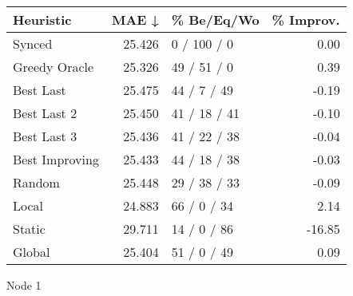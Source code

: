 \begin{tabular}{lrlr}
\toprule
\textbf{Heuristic} & \textbf{MAE ↓} & \textbf{\% Be/Eq/Wo} & \textbf{\% Improv.} \\
\midrule
            Synced &         25.426 &          0 / 100 / 0 &                0.00 \\
     Greedy Oracle &         25.326 &          49 / 51 / 0 &                0.39 \\
         Best Last &         25.475 &          44 / 7 / 49 &               -0.19 \\
       Best Last 2 &         25.450 &         41 / 18 / 41 &               -0.10 \\
       Best Last 3 &         25.436 &         41 / 22 / 38 &               -0.04 \\
    Best Improving &         25.433 &         44 / 18 / 38 &               -0.03 \\
            Random &         25.448 &         29 / 38 / 33 &               -0.09 \\
             Local &         24.883 &          66 / 0 / 34 &                2.14 \\
            Static &         29.711 &          14 / 0 / 86 &              -16.85 \\
            Global &         25.404 &          51 / 0 / 49 &                0.09 \\
\bottomrule
\end{tabular}
\caption{Node 1}
\label{tab:iid_lr01_le1_bs4_1}
